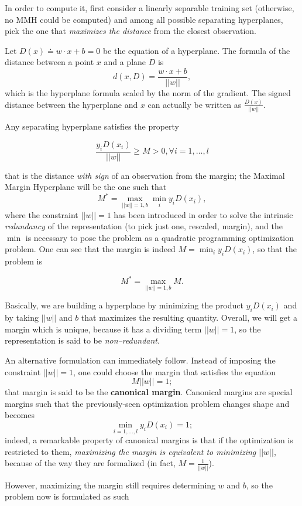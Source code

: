 \documentclass[10pt]{report}
\begin{document}
In order to compute it, first consider a linearly separable training set
(otherwise, no MMH could be computed) and among all possible separating
hyperplanes, pick the one that \emph{maximizes the distance} from the closest
observation.

Let \(D(x) \doteq w \cdot x + b = 0\) be the equation of a hyperplane.
The formula of the distance between a point \(x\) and a plane \(D\) is
\[d(x, D) = \frac{w \cdot x + b}{||w||},\] which is the hyperplane formula
scaled by the norm of the gradient. The signed distance between the hyperplane
and \(x\) can actually be written as \(\displaystyle \frac{D(x)}{||w||}.\)

Any separating hyperplane satisfies the property

$$\displaystyle \frac{y_i D(x_i)}{||w||} \geq M > 0, \forall i=1, \dots, l$$

that is the distance \emph{with sign} of an observation from the margin; the Maximal Margin Hyperplane will be the one such that
\[M^ * = \max_{||w|| = 1,b} \min_i y_i D(x_i),\] where the constraint
\(||w|| = 1\) has been introduced in order to solve the intrinsic \emph{redundancy} of
the representation (to pick just one, rescaled, margin), and the \(\min\)
is necessary to pose the problem as a quadratic programming optimization problem. One can see
that the margin is indeed \(M = \min_i y_i D(x_i)\), so that the problem is

$$M^* = \max_{||w|| = 1,b} M.$$

Basically, we are building a hyperplane by minimizing the product
\(y_i D(x_i)\) and by taking \(||w||\) and \(b\) that maximizes the
resulting quantity. Overall, we will get a margin which is unique,
because it has a dividing term \(||w|| = 1\), so the representation is
said to be \emph{non--redundant}.

An alternative formulation can immediately follow. Instead of imposing the
constraint \(||w|| = 1\), one could choose the margin that satisfies the
equation \[M||w|| = 1;\] that margin is said to be the \textbf{canonical margin}.
Canonical margins are special margins such that the previously-seen
optimization problem changes shape and becomes \[\min_{i=1,\dots,l} y_i D(x_i) = 1;\] indeed,
a remarkable property of canonical margins is that if the optimization is restricted to them, \emph{maximizing the margin is equivalent to minimizing \(||w||\)}, because
of the way they are formalized (in fact, \(M = \frac{1}{||w||}\)).

However, maximizing the margin still requires determining \(w\) and
\(b\), so the problem now is formulated as such
\end{document}
